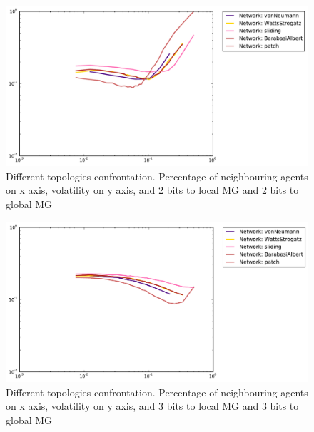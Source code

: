 \begin{figure}[h]
\begin{center}
\includegraphics[scale=0.4]{images/results/topologies_confront_m2.pdf}
\caption{Different topologies confrontation. Percentage of neighbouring agents on x axis, volatility on y axis, and 2 bits to local MG and 2 bits to global MG}
\label{fig:topologies confrontation 2}
\end{center}
\end{figure}

\begin{figure}[h]
\begin{center}
\includegraphics[scale=0.4]{images/results/topologies_confront_m3.pdf}
\caption{Different topologies confrontation. Percentage of neighbouring agents on x axis, volatility on y axis, and 3 bits to local MG and 3 bits to global MG}
\label{fig:topologies confrontation 3}
\end{center}
\end{figure}